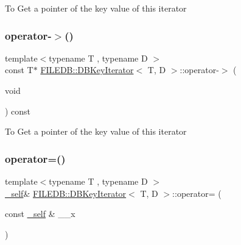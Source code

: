 To Get a pointer of the key value of this iterator \mbox{\label{classFILEDB_1_1DBKeyIterator_a453e5281ba078f217558d44c049c564c}} 
\subsubsection{\texorpdfstring{operator-\/$>$()}{operator->()}\hspace{0.1cm}{\footnotesize\ttfamily [2/2]}}
{\footnotesize\ttfamily template$<$typename T , typename D $>$ \\
const T$\ast$ \mbox{\hyperlink{classFILEDB_1_1DBKeyIterator}{F\+I\+L\+E\+D\+B\+::\+D\+B\+Key\+Iterator}}$<$ T, D $>$\+::operator-\/$>$ (\begin{DoxyParamCaption}\item[{void}]{ }\end{DoxyParamCaption}) const\hspace{0.3cm}{\ttfamily [inline]}}

To Get a pointer of the key value of this iterator \mbox{\label{classFILEDB_1_1DBKeyIterator_adfa49c128d637dae0263553529126575}} 
\subsubsection{\texorpdfstring{operator=()}{operator=()}\hspace{0.1cm}{\footnotesize\ttfamily [1/2]}}
{\footnotesize\ttfamily template$<$typename T , typename D $>$ \\
\mbox{\hyperlink{classFILEDB_1_1DBKeyIterator_aaf7773c7a848ec6e04bc738dd794ace1}{\+\_\+self}}\& \mbox{\hyperlink{classFILEDB_1_1DBKeyIterator}{F\+I\+L\+E\+D\+B\+::\+D\+B\+Key\+Iterator}}$<$ T, D $>$\+::operator= (\begin{DoxyParamCaption}\item[{const \mbox{\hyperlink{classFILEDB_1_1DBKeyIterator_aaf7773c7a848ec6e04bc738dd794ace1}{\+\_\+self}} \&}]{\+\_\+\+\_\+x }\end{DoxyParamCaption})\hspace{0.3cm}{\ttfamily [inline]}}


